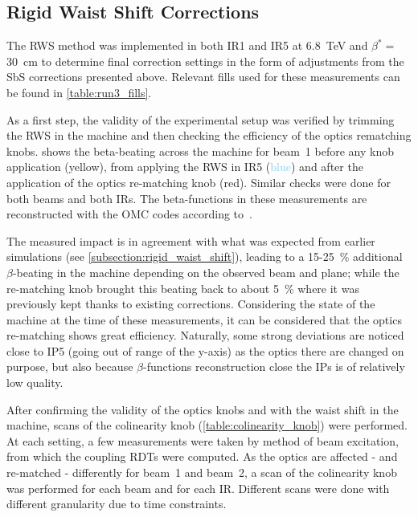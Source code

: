 \subsection{Rigid Waist Shift Corrections}
\label{subsection:rws_pos_measurements_corrections}

The RWS method was implemented in both IR\num{1} and IR\num{5} at \qty{6.8}{\tera\electronvolt} and \(\beta^{*}=\) \qty{30}{\centi\meter} to determine final correction settings in the form of adjustments from the SbS corrections presented above.
Relevant fills used for these measurements can be found in \cref{table:run3_fills}.
\break

As a first step, the validity of the experimental setup was verified by trimming the RWS in the machine and then checking the efficiency of the optics rematching knobs.
 shows the \gls{beta-beating} across the machine for beam~\num{1} before any knob application (\textcolor{butter}{yellow}), from applying the RWS in IR\num{5} (\textcolor{skyblue}{blue}) and after the application of the optics re-matching knob (\textcolor{scarletred}{red}).
Similar checks were done for both beams and both IRs.
The \glspl{beta-function} in these measurements are reconstructed with the \acrshort{OMC} codes according to~\cite{PRAB:Wegscheider:Analytical_N_BPM}.

The measured impact is in agreement with what was expected from earlier simulations (see \cref{subsection:rigid_waist_shift}), leading to a \num{15}-\qty{25}{\percent} additional \(\beta\)-beating in the machine depending on the observed beam and plane; while the re-matching knob brought this beating back to about \qty{5}{\percent} where it was previously kept thanks to existing corrections.
Considering the state of the machine at the time of these measurements, it can be considered that the optics re-matching shows great efficiency.
Naturally, some strong deviations are noticed close to IP\num{5} (going out of range of the y-axis) as the optics there are changed on purpose, but also because \(\beta\)-functions reconstruction close the IPs is of relatively low quality.

After confirming the validity of the optics knobs and with the waist shift in the machine, scans of the colinearity knob (\cref{table:colinearity_knob}) were performed.
At each setting, a few measurements were taken by method of beam excitation, from which the coupling \glspl{RDT} were computed.
As the \gls{optics} are affected - and re-matched - differently for beam~\num{1} and beam~\num{2}, a scan of the colinearity knob was performed for each beam and for each IR.
Different scans were done with different granularity due to time constraints.

